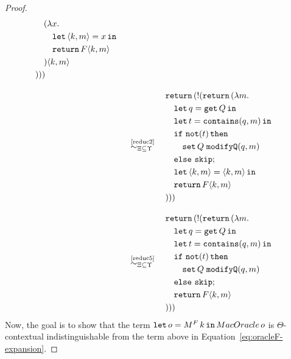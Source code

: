 \begin{proof}
{\begin{align}
\begin{aligned}
        &\quad(\lambda x. \\
        &\quad\quad \mathtt{let}\,\langle k,m \rangle=x\,\mathtt{in}\, \\
        &\quad\quad \mathtt{return}\, F\langle k,m \rangle \\
        &\quad)\langle k,m \rangle \\
        &)))
    \end{aligned} \nonumber
    \\[2ex]
    &\quad\overset{\text{~\ref{reduc2}}}{\sim_{\Xi\subseteq\Upsilon}}\quad
    \begin{aligned}
        &\mathtt{return}\,(\mathord{!}(\mathtt{return}\,(\lambda m. \\
        &\quad \mathtt{let}\,q=\mathtt{get}\, Q\,\mathtt{in}\, \\
        &\quad \mathtt{let}\,t=\mathtt{contains}(q,m)\,\mathtt{in}\, \\
        &\quad \mathtt{if}\ \mathtt{not}(t)\,\mathtt{then} \\
        &\qquad\mathtt{set}\,Q\;\mathtt{modifyQ}(q,m) \\
        &\quad\mathtt{else}\ \mathtt{skip}; \\
        &\quad \mathtt{let}\,\langle k,m \rangle=\langle k,m \rangle\,\mathtt{in}\, \\
        &\quad \mathtt{return}\, F\langle k,m \rangle \\
        &)))
    \end{aligned} \nonumber
    \\[2ex]
    &\quad\overset{\text{~\ref{reduc5}}}{\sim_{\Xi\subseteq\Upsilon}}\quad
    \begin{aligned} 
        &\mathtt{return}\,(\mathord{!}(\mathtt{return}\,(\lambda m. \\
        &\quad \mathtt{let}\,q=\mathtt{get}\, Q\,\mathtt{in}\, \\
        &\quad \mathtt{let}\,t=\mathtt{contains}(q,m)\,\mathtt{in}\, \\
        &\quad \mathtt{if}\ \mathtt{not}(t)\,\mathtt{then} \\
        &\qquad\mathtt{set}\,Q\;\mathtt{modifyQ}(q,m) \\
        &\quad \mathtt{else}\ \mathtt{skip}; \\
        &\quad \mathtt{return}\, F\langle k,m \rangle \\
        &)))
    \end{aligned} \label{eq:oracleF-expansion} 
\end{align}
}
Now, the goal is to show that the term $\mathtt{let}\,o=M^F\,k\,\mathtt{in}\, MacOracle\,o$ is $\Theta$-contextual indistinguishable from the term above in Equation~\ref{eq:oracleF-expansion}.


\end{proof}
